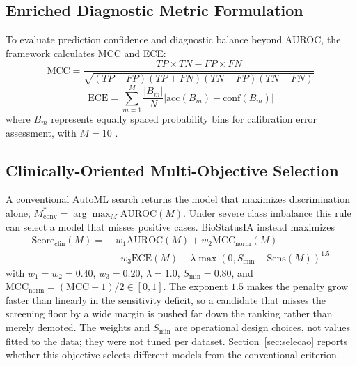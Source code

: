 \documentclass[conference]{IEEEtran}
\begin{document}
\subsection{Enriched Diagnostic Metric Formulation}
To evaluate prediction confidence and diagnostic balance beyond AUROC, the framework calculates MCC and ECE:
\begin{equation}
\text{MCC} = \frac{TP \times TN - FP \times FN}{\sqrt{(TP+FP)(TP+FN)(TN+FP)(TN+FN)}}
\end{equation}
\begin{equation}
\text{ECE} = \sum_{m=1}^{M} \frac{|B_m|}{N} \left|\text{acc}(B_m) - \text{conf}(B_m)\right|
\end{equation}
where $B_m$ represents equally spaced probability bins for calibration error assessment, with $M=10$ \cite{mcc1975, guo2017calibration}.

\subsection{Clinically-Oriented Multi-Objective Selection}
A conventional AutoML search returns the model that maximizes discrimination alone, $M^*_{\text{conv}} = \arg\max_{M} \text{AUROC}(M)$. Under severe class imbalance this rule can select a model that misses positive cases. BioStatusIA instead maximizes
\begin{align}
\text{Score}_{\text{clin}}(M) = & \; w_1 \text{AUROC}(M) + w_2 \text{MCC}_{\text{norm}}(M) \nonumber \\
& - w_3 \text{ECE}(M) - \lambda \max\!\left(0, S_{\min} - \text{Sens}(M)\right)^{1.5}
\end{align}
with $w_1 = w_2 = 0.40$, $w_3 = 0.20$, $\lambda = 1.0$, $S_{\min} = 0.80$, and $\text{MCC}_{\text{norm}} = (\text{MCC}+1)/2 \in [0,1]$. The exponent $1.5$ makes the penalty grow faster than linearly in the sensitivity deficit, so a candidate that misses the screening floor by a wide margin is pushed far down the ranking rather than merely demoted. The weights and $S_{\min}$ are operational design choices, not values fitted to the data; they were not tuned per dataset. Section~\ref{sec:selecao} reports whether this objective selects different models from the conventional criterion.
\end{document}
